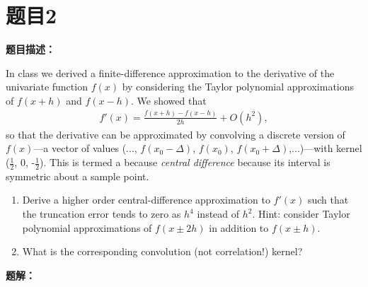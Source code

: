 \documentclass[UTF8]{ctexart}
\begin{document}
	\section{题目2}
	\textbf{题目描述：}
	
	In class we derived a finite-difference approximation to the derivative of the univariate function $f(x)$ by considering the Taylor polynomial approximations of $f(x + h)$ and $f(x - h)$.
	We showed that
	\begin{align*}
		f'(x)=\frac{f(x+h)-f(x-h)}{2h}+O(h^2),
	\end{align*}
	so that the derivative can be approximated by convolving a discrete version of $f(x)$—a vector
	of values (..., $f(x_0-\Delta)$, $f(x_0)$, $f(x_0+\Delta)$,...)—with kernel ($\frac{1}{2}$, 0, -$\frac{1}{2}$). This is termed a because \textit{central difference} because its interval is symmetric about a sample point.
	\begin{enumerate}
		\item Derive a higher order central-difference approximation to $f'(x)$ such that the truncation
		error tends to zero as $h^4$ instead of $h^2$. Hint: consider Taylor polynomial approximations of $f(x \pm 2h)$ in addition to $f(x \pm h)$.
		\item What is the corresponding convolution (not correlation!) kernel?
	\end{enumerate}
	
	
	
	\textbf{题解：}
	
\end{document}
